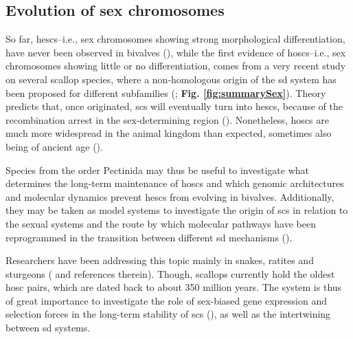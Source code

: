 \subsection{Evolution of sex chromosomes}
So far, \glspl{hesc}--i.e., sex chromosomes showing strong morphological differentiation, have never been observed in bivalves (\textbf{\cite{breton2018sex}}), while the first evidence of \glspl{hosc}--i.e., sex chromosomes showing little or no differentiation, comes from a very recent study on several scallop species, where a non-homologous origin of the \gls{sd} system has been proposed for different subfamilies (\textbf{\cite{han2022ancient}}; \textbf{Fig. \ref{fig:summarySex}}). Theory predicts that, once originated, \glspl{sc} will eventually turn into \glspl{hesc}, because of the recombination arrest in the sex-determining region (\textbf{\cite{bachtrog2014sex, beukeboom2014evolution, han2022ancient}}). Nonetheless, \glspl{hosc} are much more widespread in the animal kingdom than expected, sometimes also being of ancient age (\textbf{\cite{bachtrog2014sex, han2022ancient}}).

Species from the order Pectinida may thus be useful to investigate what determines the long-term maintenance of \glspl{hosc} and which genomic architectures and molecular dynamics prevent \glspl{hesc} from evolving in bivalves. Additionally, they may be taken as model systems to investigate the origin of \glspl{sc} in relation to the sexual systems and the route by which molecular pathways have been reprogrammed in the transition between different \gls{sd} mechanisms (\textbf{\cite{han2022ancient}}).

Researchers have been addressing this topic mainly in snakes, ratites and sturgeons (\textbf{\cite{bachtrog2014sex, han2022ancient}} and references therein). Though, scallops currently hold the oldest \gls{hosc} pairs, which are dated back to about 350 million years. The system is thus of great importance to investigate the role of sex-biased gene expression and selection forces in the long-term stability of \glspl{sc} (\textbf{\cite{han2022ancient}}), as well as the intertwining between \gls{sd} systems.

